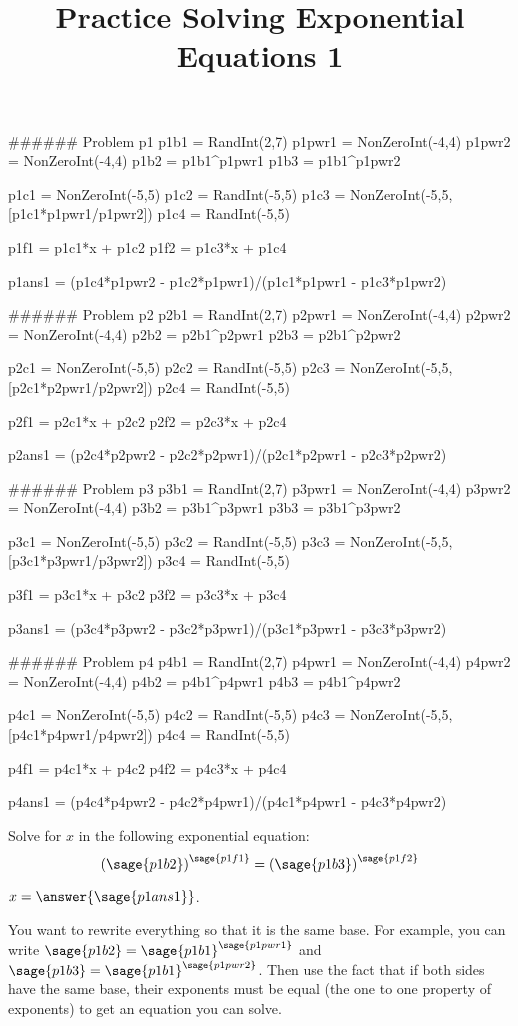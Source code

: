 \documentclass{ximera}
\title{Practice Solving Exponential Equations 1}
\begin{document}


\begin{sagesilent}

###### Problem p1
p1b1 = RandInt(2,7)
p1pwr1 = NonZeroInt(-4,4)
p1pwr2 = NonZeroInt(-4,4)
p1b2 = p1b1^p1pwr1
p1b3 = p1b1^p1pwr2

p1c1 = NonZeroInt(-5,5)
p1c2 = RandInt(-5,5)
p1c3 = NonZeroInt(-5,5,[p1c1*p1pwr1/p1pwr2])
p1c4 = RandInt(-5,5)

p1f1 = p1c1*x + p1c2
p1f2 = p1c3*x + p1c4

p1ans1 = (p1c4*p1pwr2 - p1c2*p1pwr1)/(p1c1*p1pwr1 - p1c3*p1pwr2)


###### Problem p2
p2b1 = RandInt(2,7)
p2pwr1 = NonZeroInt(-4,4)
p2pwr2 = NonZeroInt(-4,4)
p2b2 = p2b1^p2pwr1
p2b3 = p2b1^p2pwr2

p2c1 = NonZeroInt(-5,5)
p2c2 = RandInt(-5,5)
p2c3 = NonZeroInt(-5,5,[p2c1*p2pwr1/p2pwr2])
p2c4 = RandInt(-5,5)

p2f1 = p2c1*x + p2c2
p2f2 = p2c3*x + p2c4

p2ans1 = (p2c4*p2pwr2 - p2c2*p2pwr1)/(p2c1*p2pwr1 - p2c3*p2pwr2)


###### Problem p3
p3b1 = RandInt(2,7)
p3pwr1 = NonZeroInt(-4,4)
p3pwr2 = NonZeroInt(-4,4)
p3b2 = p3b1^p3pwr1
p3b3 = p3b1^p3pwr2

p3c1 = NonZeroInt(-5,5)
p3c2 = RandInt(-5,5)
p3c3 = NonZeroInt(-5,5,[p3c1*p3pwr1/p3pwr2])
p3c4 = RandInt(-5,5)

p3f1 = p3c1*x + p3c2
p3f2 = p3c3*x + p3c4

p3ans1 = (p3c4*p3pwr2 - p3c2*p3pwr1)/(p3c1*p3pwr1 - p3c3*p3pwr2)


###### Problem p4
p4b1 = RandInt(2,7)
p4pwr1 = NonZeroInt(-4,4)
p4pwr2 = NonZeroInt(-4,4)
p4b2 = p4b1^p4pwr1
p4b3 = p4b1^p4pwr2

p4c1 = NonZeroInt(-5,5)
p4c2 = RandInt(-5,5)
p4c3 = NonZeroInt(-5,5,[p4c1*p4pwr1/p4pwr2])
p4c4 = RandInt(-5,5)

p4f1 = p4c1*x + p4c2
p4f2 = p4c3*x + p4c4

p4ans1 = (p4c4*p4pwr2 - p4c2*p4pwr1)/(p4c1*p4pwr1 - p4c3*p4pwr2)

\end{sagesilent}

\begin{problem}
    Solve for $x$ in the following exponential equation:
    \[
        \left(\sage{p1b2}\right)^{\sage{p1f1}} = \left(\sage{p1b3}\right)^{\sage{p1f2}}
    \]

    $x = \answer{\sage{p1ans1}}$.
    \begin{feedback}
        You want to rewrite everything so that it is the same base. For example, you can write $\sage{p1b2} = \sage{p1b1}^{\sage{p1pwr1}}$ and $\sage{p1b3} = \sage{p1b1}^{\sage{p1pwr2}}$. Then use the fact that if both sides have the same base, their exponents must be equal (the one to one property of exponents) to get an equation you can solve. 
    \end{feedback}
\end{problem}
\end{document}
